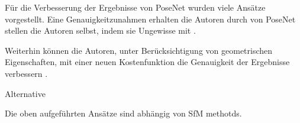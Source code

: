 Für die Verbesserung der Ergebnisse von PoseNet wurden viele Ansätze vorgestellt. Eine Genauigkeitzunahmen erhalten die Autoren durch  von PoseNet stellen die Autoren selbst, indem sie Ungewisse mit .

Weiterhin können die Autoren, unter Berücksichtigung von geometrischen Eigenschaften, mit einer neuen Kostenfunktion die Genauigkeit der Ergebnisse verbessern \cite{kendallGeometricLossFunctions2017}.

Alternative 

Die oben aufgeführten Ansätze sind abhängig von SfM methotds.



% 
